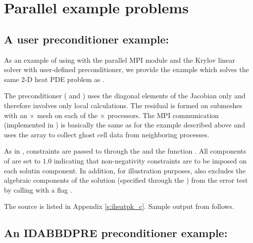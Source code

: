 \section{Parallel example problems}\label{s:ex_parallel}

\subsection{A user preconditioner example: }\label{ss:iheatpk}

As an example of using {\ida} with the parallel MPI {\nvecp} module and the Krylov 
linear solver {\idaspgmr} with user-defined preconditioner, we provide the example
 which solves the same 2-D heat PDE problem as . 

The preconditioner ( and ) uses the diagonal 
elements of the Jacobian only and therefore involves only local calculations. 
The residual is formed on submeshes with an  $\times$  mesh 
on each of the  $\times$  processors. 
The MPI communication (implemented in ) is basically the same
as for the  example described above and uses the  array
to collect ghost cell data from neighboring processes.

As in , constraints are passed to {\ida} through
the   and the function .
All components of  are set to $1.0$ indicating that non-negativity
constraints are to be imposed on each solutin component.
In addition, for illustration purposes,  also excludes the algebraic 
components of the solution (specified through the  ) from the 
error test by calling  with a flag .

The source is listed in Appendix \ref{s:iheatpk_c}.
Sample output from  follows.


\subsection{An IDABBDPRE preconditioner example: }\label{ss:iwebbbd}

